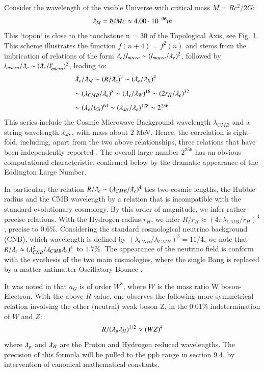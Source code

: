 \documentclass[twoside,draft]{article}
\begin{document}
\begin{sloppypar}
Consider the wavelength of the visible Universe with critical mass $M= Rc^2/2G$: $$\lambdabar_{M} = \hbar /Mc \approx 4.00 \cdot 10^{-96} m$$ This `topon` is close to the touchstone n = 30 of the Topological Axis, see Fig. 1. This scheme illustrates the function $f(n + 4) = f^{2}(n)$
and stems from the imbrication of relations of the form $\lambdabar_{e} /l_{micro} \sim (l_{macro} /\lambdabar_{e})^{2}$, followed by $ l_{macro} /\lambdabar_{e} \sim (\lambdabar_{e} /l^{\prime}_{micro} )^{2}$, leading to:
$$
\begin{array}{ll}
%
\displaystyle
\lambdabar_{e}/\lambdabar_{M} \sim (R/\lambdabar_{e})^{2} \sim (\lambdabar_{e}/ \lambdabar_{X})^{4}\\[+8pt]  %
\sim (\lambda_{CMB}/ \lambdabar_{e})^{8} \sim (\lambdabar_{e}/\lambdabar_{W})^{16} \sim (2r_{H} /\lambdabar_{e})^{32}\\[+8pt] %
\sim (\lambdabar_{e}/ l_{Gl} )^{64} \sim (\lambdabar_{str} /\lambdabar_{e} )^{128} \sim 2^{256}\\ %
\end{array}
$$
This series include the Cosmic Microwave Background wavelength $\lambda_{CMB}$ and a string wavelength $\lambdabar_{str}$, with mass about 2 MeV. Hence, the correlation is eight-fold, including, apart from the two above relationships, three relations that have been independently reported \cite{Sanchez1}. The overall large number $2^{256}$ has an obvious computational characteristic, confirmed below by the dramatic appearance of the Eddington Large Number.

In particular, the relation $R/\lambdabar_{e} \sim (\lambda_{CMB} / \lambdabar_{e})^{4}$ ties two cosmic lengths, the Hubble radius and the CMB wavelength by a relation that is incompatible with the standard evolutionary cosmology. By this order of magnitude, we infer rather precise relations. With the Hydrogen radius $r_H$, we infer 
$ R/r_H \approx (4\pi \lambda_{CMB}/r_H)^{4}$, precise to $0.6\%$. 
Considering the standard cosmological neutrino background (CNB), which wavelength is defined by $(\lambda_{CNB} / \lambda_{CMB})^{3} = 11/4$, we note that $R/ \lambdabar_{e} \approx
( \lambda_{CNB}^{2} / \lambda_{CMB} \lambdabar_{e} )^{4}$ to $1.7\%$. The appearance of the neutrino field is conform with the synthesis of the two main cosmologies, where the single Bang is replaced by a matter-antimatter Oscillatory Bounce \cite{Sanchez2}.

It was noted in \cite{Carr} that $a_{G}$ is of order $W^{8}$, where $W$ is the mass ratio W boson-Electron. With the above $R$ value, one observes the following more symmetrical relation involving the other (neutral) weak boson Z, in the 0.01\% indetermination of $W$ and $Z$:
\begin{equation}
R/(\lambdabar_{p}\lambdabar_{H})^{1/2}\approx (WZ)^4
\end{equation}
where $\lambdabar_{p}$ and $\lambdabar_{H}$ are the Proton and Hydrogen reduced wavelengths. The precision of this formula will be pulled to the ppb range in section 9.4, by intervention of canonical mathematical constants.


\end{sloppypar}
\end{document}
